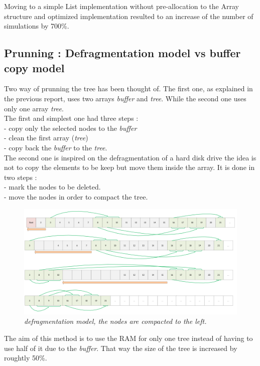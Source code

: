 Moving to a simple List implementation without pre-allocation to the Array structure and optimized implementation resulted to an increase of the number of simulations by 700\%.

\subsection{Prunning : Defragmentation model vs buffer copy model}

Two way of prunning the tree has been thought of. The first one, as  explained in the previous report, uses two arrays \textit{buffer} and \textit{tree}. While the second one uses only one array \textit{tree}.
\medskip\\
The first and simplest one had three steps : \\
- copy only the selected nodes to the \textit{buffer} \\
- clean the first array (\textit{tree}) \\
- copy back the \textit{buffer} to the \textit{tree}.
\medskip\\
The second one is inspired on the defragmentation of a hard disk drive the idea is not to copy the elements to be keep but move them inside the array. It is done in two steps : \\
- mark the nodes to be deleted. \\
- move the nodes in order to compact the tree.
\begin{figure}[H] 
\centerline{\includegraphics[width=\textwidth]{Optimisations/array.png}}
\caption{\label{fig:Defrag}\textit{defragmentation model, the nodes are compacted to the left.}}
\end{figure}
The aim of this method is to use the RAM for only one tree instead of having to use half of it due to the \textit{buffer}. That way the size of the tree is increased by roughtly 50\%.

